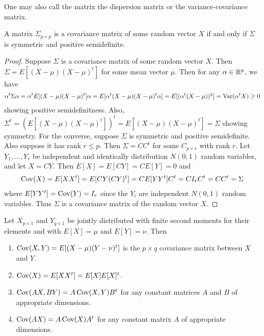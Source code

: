 One may also call the matrix the dispersion matrix or the variance-covariance matrix.

\begin{theorem}
    A matrix $\Sigma_{p \times p}$ is a covariance matrix of some random vector $X$ if and only if $\Sigma$ is symmetric and positive semidefinite.
\end{theorem}
\begin{proof}
    Suppose $\Sigma$ is a covariance matrix of some random vector $X$. Then $\Sigma = E[(X-\mu)(X-\mu)^{t}]$ for some mean vector $\mu$. Then for any $\alpha \in \mathbb{R}^{p}$, we have
    \begin{align}
        \alpha^{t}\Sigma \alpha = \alpha^{t}E[(X-\mu)(X-\mu)^{t}]\alpha = E[\alpha^{t}(X-\mu)(X-\mu)^{t}\alpha] = E[(\alpha^{t}(X-\mu))^{2}] = \operatorname{Var}(\alpha^{t}X) \geq 0
    \end{align}
    showing positive semidefinitness. Also, $\Sigma^{t} = (E[(X-\mu)(X-\mu)^{t}])^{t} = E[(X-\mu)(X-\mu)^{t}] = \Sigma$ showing symmetry. For the converse, suppose $\Sigma$ is symmetric and positive semidefinite. Also suppose it has rank $r \leq p$. Then $\Sigma = CC^{t}$ for some $C_{p \times r}$ with rank $r$. Let $Y_{1},\ldots,Y_{r}$ be independent and identically distribution $N(0,1)$ random variables, and let $X = CY$. Then $E[X] = E[CY] = CE[Y] = 0$ and
    \begin{align}
        \operatorname{Cov}(X) = E[XX^{t}] = E[CY(CY)^{t}] = CE[YY^{t}]C^{t} = C I_{r} C^{t} = CC^{t} = \Sigma
    \end{align}
    where $E[YY^{t}] = \operatorname{Cov}(Y) = I_{r}$ since the $Y_{i}$ are independent $N(0,1)$ random variables. Thus $\Sigma$ is a covariance matrix of the random vector $X$.
\end{proof}

Let $X_{p \times 1}$ and $Y_{q \times 1}$ be jointly distributed with finite second moments for their elements and with $E[X] = \mu$ and $E[Y] = \nu$. Then
\begin{enumerate}
    \item $\operatorname{Cov}(X,Y) = E[(X-\mu)(Y-\nu)^{t}]$ is the $p \times q$ covariance matrix between $X$ and $Y$.
    \item $\operatorname{Cov}(X) = E[XX^{t}] = E[X]E[X]^{t}$.
    \item $\operatorname{Cov}(AX,BY) = A \operatorname{Cov}(X,Y) B^{t}$ for any constant matrices $A$ and $B$ of appropriate dimensions.
    \item $\operatorname{Cov}(AX) = A \operatorname{Cov}(X) A^{t}$ for any constant matrix $A$ of appropriate dimensions.
\end{enumerate}

